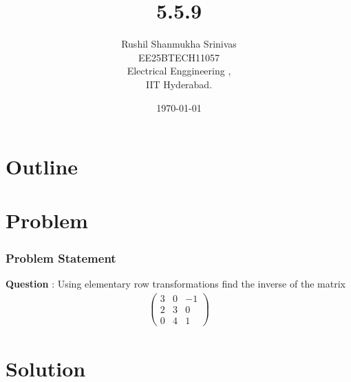 \documentclass{beamer}
\title{5.5.9}
\author{Rushil Shanmukha Srinivas \\EE25BTECH11057 \\ Electrical Enggineering ,\\IIT Hyderabad.}
\date{\today}
\theoremstyle{remark}
\newcommand{\myvec}[1]{\ensuremath{\begin{pmatrix}#1\end{pmatrix}}}
\numberwithin{equation}{section}
\begin{document}
 

\begin{frame}
\titlepage
\end{frame}

\section*{Outline}
\begin{frame}
\tableofcontents
\end{frame}
\section{Problem}
\begin{frame}
\frametitle{Problem Statement}
\textbf{Question} : 
Using elementary row transformations find the inverse of the matrix 
\begin{align}
\myvec{3&0&-1\\
       2&3&0\\
       0&4&1}
\end{align}
\end{frame}
\section{Solution}
\end{document}
